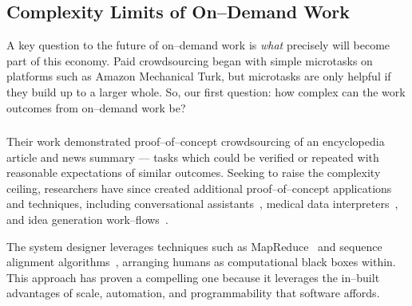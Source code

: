 \documentclass[trackingWork]{subfiles}
\begin{document}
\begin{comment}
Crowdwork
  - Kittur said let's do complex stuff
  - This works by using CS techniques
  - Clear that this works in focused cases
  - More recent shift toward using experts
\end{comment}

\subsection[What are the complexity limits of on--demand work]
{Complexity Limits of On--Demand Work}\label{sec:complexity}
A key question to the future of on--demand work is
\textit{what} precisely will become part of this economy.
Paid crowdsourcing began with simple microtasks on platforms such as
Amazon Mechanical Turk, but
microtasks are only helpful if they build up to a larger whole.
So, our first question:
how complex can the work outcomes from on--demand work be?

\subsubsection{\crowdworkpers}

Their work demonstrated proof--of--concept crowdsourcing of
an encyclopedia article and news summary
--- tasks which could be verified or repeated
with reasonable expectations of similar outcomes.
Seeking to raise the complexity ceiling,
researchers have since created
additional proof--of--concept applications and techniques,
including conversational assistants~\cite{lasecki2013chorus},
medical data interpreters~\cite{lasecki2013chorus}, and
idea generation work--flows~\cite{YuEncouragingOutside,yu2014distributed,Yu2016a}.

The system designer leverages techniques such as MapReduce~\cite{crowdForgeKittur} and
sequence alignment algorithms~\cite{lasecki2012real}, arranging humans as computational black boxes within.
This approach has proven a compelling one because
it leverages the in--built advantages of
scale,
automation, and
programmability that software affords.
\end{document}
